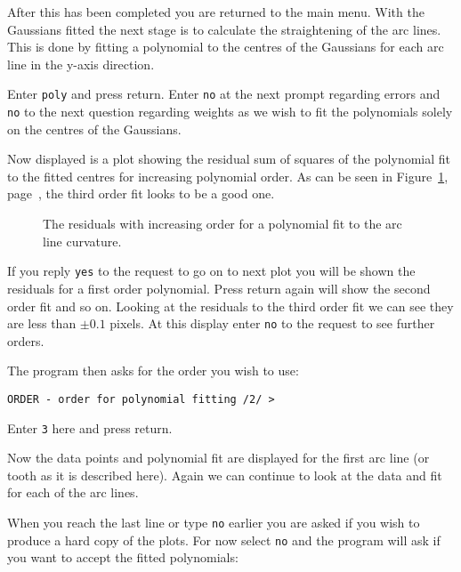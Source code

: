 \documentclass[twoside,11pt]{article}
\newcommand{\scspec}[2]{#1}
\newcommand{\scspec}[2]{#2}
\begin{document}
After this has been completed you are returned to the main menu. With
the Gaussians fitted the next stage is to calculate the straightening
of the arc lines. This is done by fitting a polynomial to the centres
of the Gaussians for each arc line in the y-axis direction.

Enter {\tt poly} and press return. Enter {\tt no} at the next prompt
regarding errors and {\tt no} to the next question regarding weights
as we wish to fit the polynomials solely on the centres of the
Gaussians.

Now displayed is a plot showing the residual sum of squares of the
polynomial fit to the fitted centres for increasing polynomial order.
As can be seen in \scspec{Figure~\ref{poly_order},
page~\pageref{poly_order},}{the figure below} the third order fit
looks to be a good one.

\begin{figure}
\begin{center}
  \scspec{\leavevmode\epsfysize=105mm\epsfbox{sc7_16.eps}}
         {\leavevmode\epsfysize=136mm}

  \parbox{140mm}{
    \caption{The residuals with increasing order for a polynomial fit to
             the arc line curvature.}
    \label{poly_order}
  }
\end{center}
\end{figure}


If you reply {\tt yes} to the request to go on to next plot you will
be shown the residuals for a first order polynomial. Press return
again will show the second order fit and so on. Looking at the
residuals to the third order fit we can see they are less than
$\pm0.1$ pixels. At this display enter {\tt no} to the request to see
further orders.

The program then asks for the order you wish to use:
{\scspec{\small}{ }
\begin{verbatim}
ORDER - order for polynomial fitting /2/ >
\end{verbatim}
}

Enter {\tt 3} here and press return.

Now the data points and polynomial fit are displayed for the first arc
line (or tooth as it is described here). Again we can continue to look
at the data and fit for each of the arc lines.

When you reach the last line or type {\tt no} earlier you are asked if
you wish to produce a hard copy of the plots. For now select {\tt no}
and the program will ask if you want to accept the fitted polynomials:
\end{document}
